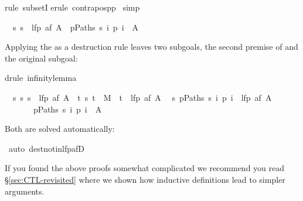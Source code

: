 \begin{isabellebody}
rule\ subsetI{\isacharparenright}\isanewline
{}erule\ contrapos{\isacharunderscore}pp{\isacharparenright}\isanewline
{}\ simp%
\begin{isamarkuptxt}%
\begin{isabelle}
\ \ {\isasymAnd}s{\isachardot}\ s\ {\isasymnotin}\ lfp\ {\isacharparenleft}af\ A{\isacharparenright}\ {\isasymLongrightarrow}\ {\isasymexists}p{\isasymin}Paths\ s{\isachardot}\ {\isasymforall}i{\isachardot}\ p\ i\ {\isasymnotin}\ A
\end{isabelle}
Applying the  as a destruction rule leaves two subgoals, the second
premise of  and the original subgoal:%
\end{isamarkuptxt}%
drule\ infinity{\isacharunderscore}lemma{\isacharparenright}%
\begin{isamarkuptxt}%
\begin{isabelle}
\ \ {\isasymAnd}s{\isachardot}\ {\isasymforall}s{\isachardot}\ s\ {\isasymnotin}\ lfp\ {\isacharparenleft}af\ A{\isacharparenright}\ {\isasymlongrightarrow}\ {\isacharparenleft}{\isasymexists}t{\isachardot}\ {\isacharparenleft}s{\isacharcomma}\ t{\isacharparenright}\ {\isasymin}\ M\ {\isasymand}\ t\ {\isasymnotin}\ lfp\ {\isacharparenleft}af\ A{\isacharparenright}{\isacharparenright}\isanewline
\ \ {\isasymAnd}s{\isachardot}\ {\isasymexists}p{\isasymin}Paths\ s{\isachardot}\ {\isasymforall}i{\isachardot}\ p\ i\ {\isasymnotin}\ lfp\ {\isacharparenleft}af\ A{\isacharparenright}\isanewline
\ \ \ \ \ \ {\isasymLongrightarrow}\ {\isasymexists}p{\isasymin}Paths\ s{\isachardot}\ {\isasymforall}i{\isachardot}\ p\ i\ {\isasymnotin}\ A
\end{isabelle}
Both are solved automatically:%
\end{isamarkuptxt}%
\ auto\ dest{\isacharcolon}not{\isacharunderscore}in{\isacharunderscore}lfp{\isacharunderscore}afD{\isacharparenright}\isanewline
{}%
\begin{isamarkuptext}%
If you found the above proofs somewhat complicated we recommend you read
\S\ref{sec:CTL-revisited} where we shown how inductive definitions lead to
simpler arguments.


\end{isamarkuptext}
\end{isabellebody}
